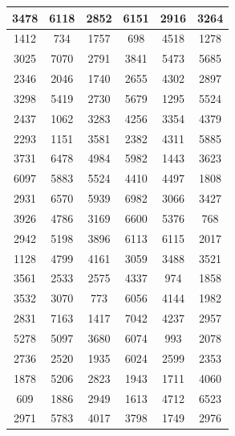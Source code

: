 \begin{table}[H]
\begin{tabular}{|c c||c c||c c|}
    3478 & 6118 & 2852 & 6151 & 2916 & 3264 \\ \hline
    1412 & 734 & 1757 & 698 & 4518 & 1278 \\ \hline
    3025 & 7070 & 2791 & 3841 & 5473 & 5685 \\ \hline
    2346 & 2046 & 1740 & 2655 & 4302 & 2897 \\ \hline
    3298 & 5419 & 2730 & 5679 & 1295 & 5524 \\ \hline
    2437 & 1062 & 3283 & 4256 & 3354 & 4379 \\ \hline
    2293 & 1151 & 3581 & 2382 & 4311 & 5885 \\ \hline
    3731 & 6478 & 4984 & 5982 & 1443 & 3623 \\ \hline
    6097 & 5883 & 5524 & 4410 & 4497 & 1808 \\ \hline
    2931 & 6570 & 5939 & 6982 & 3066 & 3427 \\ \hline
    3926 & 4786 & 3169 & 6600 & 5376 & 768 \\ \hline
    2942 & 5198 & 3896 & 6113 & 6115 & 2017 \\ \hline
    1128 & 4799 & 4161 & 3059 & 3488 & 3521 \\ \hline
    3561 & 2533 & 2575 & 4337 & 974 & 1858 \\ \hline
    3532 & 3070 & 773 & 6056 & 4144 & 1982 \\ \hline
    2831 & 7163 & 1417 & 7042 & 4237 & 2957 \\ \hline
    5278 & 5097 & 3680 & 6074 & 993 & 2078 \\ \hline
    2736 & 2520 & 1935 & 6024 & 2599 & 2353 \\ \hline
    1878 & 5206 & 2823 & 1943 & 1711 & 4060 \\ \hline
    609 & 1886 & 2949 & 1613 & 4712 & 6523 \\ \hline
    2971 & 5783 & 4017 & 3798 & 1749 & 2976 \\ \hline
    \end{tabular}
\end{table}
\newpage


